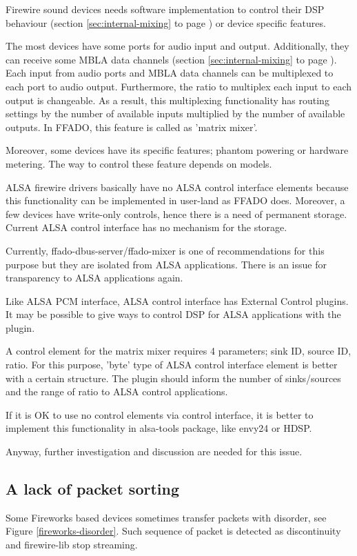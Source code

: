 \documentclass[onecolumn]{jarticle}
\begin{document}
Firewire sound devices needs software implementation to control their DSP behaviour (section \ref{sec:internal-mixing} to page \pageref{sec:internal-mixing}) or device specific features.

The most devices have some ports for audio input and output. Additionally, they can receive some MBLA data channels (section \ref{sec:internal-mixing} to page \pageref{sec:internal-mixing}). Each input from audio ports and MBLA data channels can be multiplexed to each port to audio output. Furthermore, the ratio to multiplex each input to each output is changeable. As a result, this multiplexing functionality has routing settings by the number of available inputs multiplied by the number of available outputs. In FFADO, this feature is called as 'matrix mixer'.

Moreover, some devices have its specific features; phantom powering or hardware metering. The way to control these feature depends on models.

ALSA firewire drivers basically have no ALSA control interface elements because this functionality can be implemented in user-land as FFADO does. Moreover, a few devices have write-only controls, hence there is a need of permanent storage. Current ALSA control interface has no mechanism for the storage.

Currently, ffado-dbus-server/ffado-mixer is one of recommendations for this purpose but they are isolated from ALSA applications. There is an issue for transparency to ALSA applications again.

Like ALSA PCM interface, ALSA control interface has External Control plugins. It may be possible to give ways to control DSP for ALSA applications with the plugin.

A control element for the matrix mixer requires 4 parameters; sink ID, source ID, ratio. For this purpose, 'byte' type of ALSA control interface element is better with a certain structure. The plugin should inform the number of sinks/sources and the range of ratio to ALSA control applications.

If it is OK to use no control elements via control interface, it is better to implement this functionality in alsa-tools package, like envy24 or HDSP. 

Anyway, further investigation and discussion are needed for this issue.


\subsection{A lack of packet sorting}
Some Fireworks based devices sometimes transfer packets with disorder, see Figure \ref{fireworks-disorder}. Such sequence of packet is detected as discontinuity and firewire-lib stop streaming.
\end{document}
